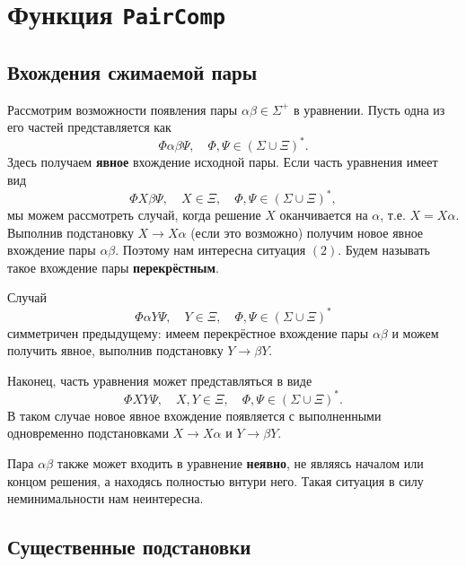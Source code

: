 \documentclass[12pt]{article}
\begin{document}
\section{Функция \texttt{PairComp}}

\subsection{Вхождения сжимаемой пары}

Рассмотрим возможности появления пары $\alpha \beta \in \Sigma^+ $ в
уравнении. Пусть одна из его частей представляется как 
\begin{equation}
  \Phi \alpha \beta \Psi, \quad \Phi, \Psi \in (\Sigma \cup \Xi)^*.
\end{equation}
Здесь получаем \textbf{явное} вхождение исходной пары. Если часть уравнения
имеет вид
\begin{equation}
  \Phi X \beta \Psi, \quad X \in \Xi, \quad \Phi, \Psi \in (\Sigma \cup \Xi)^*,
\end{equation}
мы можем рассмотреть случай, когда решение $X$ оканчивается на $\alpha$, т.е.
$X = X\alpha$. Выполнив подстановку $X \to X\alpha$ (если это возможно)
получим новое явное вхождение пары $\alpha \beta$. Поэтому нам интересна
ситуация $(2)$. Будем называть такое вхождение пары \textbf{перекрёстным}.

Случай
\begin{equation}
  \Phi \alpha Y \Psi, \quad Y \in \Xi, \quad \Phi, \Psi \in (\Sigma \cup \Xi)^*
\end{equation}
симметричен предыдущему: имеем перекрёстное вхождение пары $\alpha \beta$ и
можем получить явное, выполнив подстановку $Y \to \beta Y$.

Наконец, часть уравнения может представляться в виде
\begin{equation}
  \Phi X Y \Psi, \quad X, Y \in \Xi, \quad \Phi, \Psi \in (\Sigma \cup \Xi)^*.
\end{equation}
В таком случае новое явное вхождение появляется с выполненными одновременно
подстановками $X \to X \alpha$ и $Y \to \beta Y$.

Пара $\alpha \beta$ также может входить в уравнение \textbf{неявно}, не являясь
началом или концом решения, а находясь полностью внтури него. Такая
ситуация в силу неминимальности нам неинтересна.

\subsection{Существенные подстановки}
\end{document}

